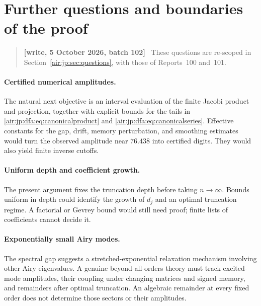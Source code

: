 \documentclass[11pt,letterpaper]{article}
\numberwithin{equation}{section}
\theoremstyle{remark}
\newenvironment{writenotejp}{\par\smallskip\begin{quote}\small\textbf{[write, 5 October 2026, batch 102]}\ }{\end{quote}\smallskip}
\begin{document}
\section{Further questions and boundaries of the proof}\label{air:jp:dfa:sec:questions}
\begin{writenotejp}
These questions are re-scoped in Section~\ref{air:jp:sec:questions}, with those of Reports~100 and~101.
\end{writenotejp}
\paragraph{Certified numerical amplitudes.}
The natural next objective is an interval evaluation of the finite Jacobi product and projection, together with explicit bounds for the tails in \eqref{air:jp:dfa:eq:canonicalproduct} and \eqref{air:jp:dfa:eq:canonicalseries}. Effective constants for the gap, drift, memory perturbation, and smoothing estimates would turn the observed amplitude near $76.438$ into certified digits. They would also yield finite inverse cutoffs.

\paragraph{Uniform depth and coefficient growth.}
The present argument fixes the truncation depth before taking $n\to\infty$. Bounds uniform in depth could identify the growth of $d_j$ and an optimal truncation regime. A factorial or Gevrey bound would still need proof; finite lists of coefficients cannot decide it.

\paragraph{Exponentially small Airy modes.}
The spectral gap suggests a stretched-exponential relaxation mechanism involving other Airy eigenvalues. A genuine beyond-all-orders theory must track excited-mode amplitudes, their coupling under changing matrices and signed memory, and remainders after optimal truncation. An algebraic remainder at every fixed order does not determine those sectors or their amplitudes.
\end{document}
